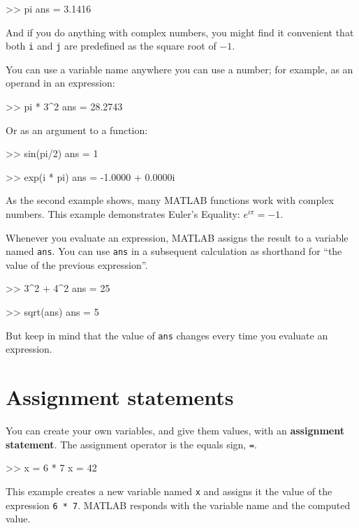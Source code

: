 \documentclass[
]{book}
\numberwithin{Answer}{chapter}
\numberwithin{Exercise}{chapter}
\begin{document}
\begin{code}
>> pi
ans = 3.1416
\end{code}

And if you do anything with complex numbers, you might find it
convenient that both {\tt i} and {\tt j} are predefined as the square
root of $-1$.

You can use a variable name anywhere you can use a number; for example, as
an operand in an expression:

\begin{code}
>> pi * 3^2
ans = 28.2743
\end{code}

Or as an argument to a function:

\begin{code}
>> sin(pi/2)
ans = 1

>> exp(i * pi)
ans = -1.0000 + 0.0000i
\end{code}

As the second example shows, many MATLAB functions work with
complex numbers.  This example demonstrates Euler's Equality:
$e^{i \pi} = -1$.

Whenever you evaluate an expression, MATLAB assigns the result to
a variable named {\tt ans}.  You can use {\tt ans} in a subsequent
calculation as shorthand for ``the value of the previous expression''.

\begin{code}
>> 3^2 + 4^2
ans = 25

>> sqrt(ans)
ans = 5
\end{code}

But keep in mind that the value of {\tt ans} changes every time
you evaluate an expression.


\section{Assignment statements}

You can create your own variables, and give them values, with
an {\bf assignment statement}.  The assignment operator is the
equals sign, {\tt =}.

\begin{code}
>> x = 6 * 7
x = 42
\end{code}

This example creates a new variable named {\tt x} and assigns it the
value of the expression {\tt 6 * 7}.  MATLAB responds with the
variable name and the computed value.
\end{document}
